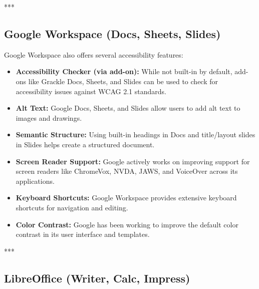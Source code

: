 ***

\subsection{Google Workspace (Docs, Sheets, Slides)}
\label{sub:google-workspace-docs-sheets-slides}

Google Workspace also offers several accessibility features\supercite{GoogleAccessibility}:
\begin{itemize}
	\item \textbf{Accessibility Checker (via add-on):} While not built-in by default, add-ons like Grackle Docs, Sheets, and Slides can be used to check for accessibility issues against WCAG 2.1 standards.
	\item \textbf{Alt Text:} Google Docs, Sheets, and Slides allow users to add alt text to images and drawings.
	\item \textbf{Semantic Structure:} Using built-in headings in Docs and title/layout slides in Slides helps create a structured document.
	\item \textbf{Screen Reader Support:} Google actively works on improving support for screen readers like ChromeVox, NVDA, JAWS, and VoiceOver across its applications.
	\item \textbf{Keyboard Shortcuts:} Google Workspace provides extensive keyboard shortcuts for navigation and editing.
	\item \textbf{Color Contrast:} Google has been working to improve the default color contrast in its user interface and templates.
\end{itemize}

***

\subsection{LibreOffice (Writer, Calc, Impress)}
\label{sub:libreoffice-writer-calc-impress}

